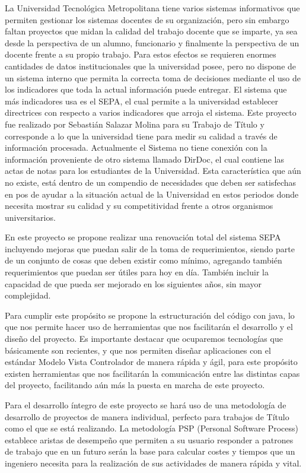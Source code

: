 \documentclass[a4paper,12pt,openany,oneside]{book}
\begin{document}
La Universidad Tecnológica Metropolitana tiene varios sistemas informativos que permiten gestionar los sistemas docentes de su organización, pero sin embargo faltan proyectos que midan la calidad del trabajo docente que se imparte, ya sea desde la perspectiva de un alumno, funcionario y finalmente la perspectiva de un docente frente a su propio trabajo. Para estos efectos se requieren enormes cantidades de datos institucionales que la universidad posee, pero no dispone de un sistema interno que permita la correcta toma de decisiones mediante el uso de los indicadores que toda la actual información puede entregar. El sistema que más indicadores usa es el SEPA, el cual permite a la universidad establecer directrices con respecto a varios indicadores que arroja el sistema. Este proyecto fue realizado por Sebastián Salazar Molina para su Trabajo de Título y corresponde a lo que la universidad tiene para medir su calidad a través de información procesada. Actualmente el Sistema no tiene conexión con la información proveniente de otro sistema llamado DirDoc, el cual contiene las actas de notas para los estudiantes de la Universidad. Esta característica que aún no existe, está dentro de un compendio de necesidades que deben ser satisfechas en pos de ayudar a la situación actual de la Universidad en estos periodos donde necesita mostrar su calidad y su competitividad frente a otros organismos universitarios.

En este proyecto se propone realizar una renovación total del sistema SEPA incluyendo mejoras que puedan salir de la toma de requerimientos, siendo parte de un conjunto de cosas que deben existir como mínimo, agregando también requerimientos que puedan ser útiles para hoy en día. También incluir la capacidad de que pueda ser mejorado en los siguientes años, sin mayor complejidad.

Para cumplir este propósito se propone la estructuración del código con java, lo que nos permite hacer uso de herramientas que nos facilitarán el desarrollo y el diseño del proyecto. Es importante destacar que ocuparemos tecnologías que básicamente son recientes, y que nos permiten diseñar aplicaciones con el estándar Modelo Vista Controlador de manera rápida y ágil, para este propósito existen herramientas que nos facilitarán la comunicación entre las distintas capas del proyecto, facilitando aún más la puesta en marcha de este proyecto.

Para el desarrollo íntegro de este proyecto se hará uso de una metodología de desarrollo de proyectos de manera individual, perfecto para trabajos de Título como el que se está realizando. La metodología PSP (Personal Software Process) establece aristas de desempeño que permiten a su usuario responder a patrones de trabajo que en un futuro serán la base para calcular costes y tiempos que un ingeniero necesita para la realización de sus actividades de manera rápida y vital.
\end{document}

